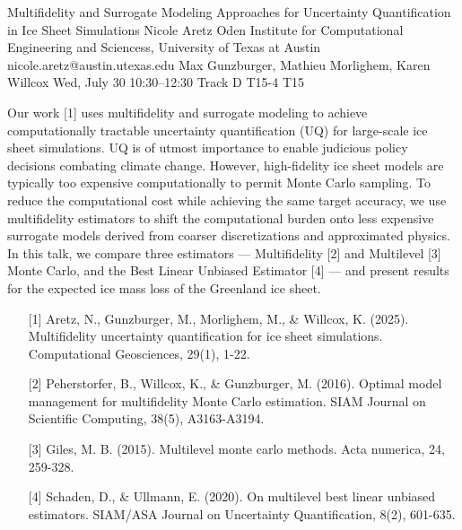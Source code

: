 \begin{talk}
\end{talk}
\begin{talk}
  {Multifidelity and Surrogate Modeling Approaches for Uncertainty Quantification in Ice Sheet Simulations}%
  {Nicole Aretz}%
  {Oden Institute for Computational Engineering and Sciencess, University of Texas at Austin}%
  {nicole.aretz@austin.utexas.edu}%
  {Max Gunzburger, Mathieu Morlighem, Karen Willcox}%
  {}%
  {Wed, July 30 10:30–12:30 Track D}%
  {T15-4}%
  {T15}%
			
Our work [1] uses multifidelity and surrogate modeling to achieve computationally tractable uncertainty quantification (UQ) for large-scale ice sheet simulations. UQ is of utmost importance to enable judicious policy decisions combating climate change. However, high-fidelity ice sheet models are typically too expensive computationally to permit Monte Carlo sampling. To reduce the computational cost while achieving the same target accuracy, we use multifidelity estimators to shift the computational burden onto less expensive surrogate models derived from coarser discretizations and approximated physics. In this talk, we compare three estimators — Multifidelity [2] and Multilevel [3] Monte Carlo, and the Best Linear Unbiased Estimator [4] — and present results for the expected ice mass loss of the Greenland ice sheet.

\medskip

\begin{enumerate}
	\item[{[1]}] Aretz, N., Gunzburger, M., Morlighem, M., \& Willcox, K. (2025). Multifidelity uncertainty quantification for ice sheet simulations. Computational Geosciences, 29(1), 1-22.
	\item[{[2]}] Peherstorfer, B., Willcox, K., \& Gunzburger, M. (2016). Optimal model management for multifidelity Monte Carlo estimation. SIAM Journal on Scientific Computing, 38(5), A3163-A3194.
    \item[{[3]}] Giles, M. B. (2015). Multilevel monte carlo methods. Acta numerica, 24, 259-328.
    \item[{[4]}] Schaden, D., \& Ullmann, E. (2020). On multilevel best linear unbiased estimators. SIAM/ASA Journal on Uncertainty Quantification, 8(2), 601-635.
\end{enumerate}

\end{talk}
